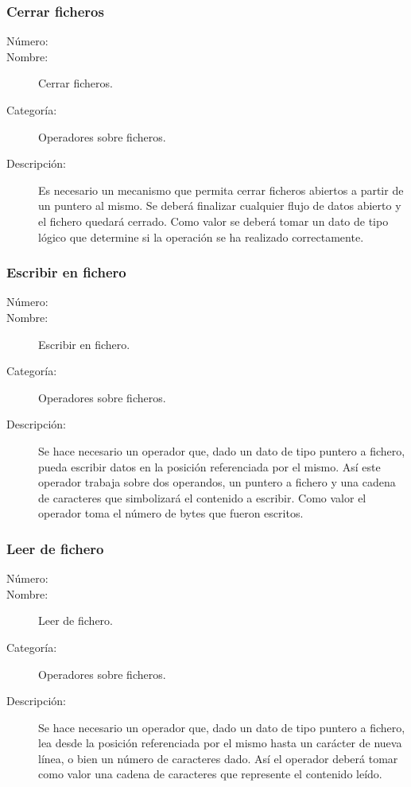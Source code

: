\subsubsection{Cerrar ficheros}
\begin{framed}
	\begin{description}
		\item [Número:] \cn
		\item [Nombre:] Cerrar ficheros.
		\item [Categoría:] Operadores sobre ficheros.
		\item [Descripción:] Es necesario un mecanismo que permita cerrar ficheros abiertos a partir de un puntero al mismo.
		Se deberá finalizar cualquier flujo de datos abierto y el fichero quedará cerrado. Como valor se deberá tomar 
		un dato de tipo lógico que determine si la operación se ha realizado correctamente.
	\end {description}
\end{framed}

\subsubsection{Escribir en fichero}
\begin{framed}
	\begin{description}
		\item [Número:] \cn
		\item [Nombre:] Escribir en fichero.
		\item [Categoría:] Operadores sobre ficheros.
		\item [Descripción:] Se hace necesario un operador que, dado un dato de tipo puntero a fichero, pueda escribir datos
		en la posición referenciada por el mismo. Así este operador trabaja sobre dos operandos, un puntero a fichero y una 
		cadena de caracteres que simbolizará el contenido a escribir. Como valor el operador toma el número de bytes que 
		fueron escritos.
	\end{description}
\end{framed}

\subsubsection{Leer de fichero}
\begin{framed}
	\begin{description}
		\item [Número:] \cn
		\item [Nombre:] Leer de fichero.
		\item [Categoría:] Operadores sobre ficheros.
		\item [Descripción:] Se hace necesario un operador que, dado un dato de tipo puntero a fichero, lea desde la
		posición referenciada por el mismo hasta un carácter de nueva línea, o bien un número de caracteres dado. Así el operador deberá tomar como valor 
		una cadena de caracteres que represente el contenido leído.
	\end{description}
\end{framed}

